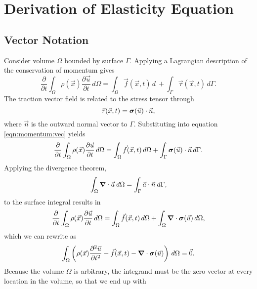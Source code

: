 \section{Derivation of Elasticity Equation}

\subsection{Vector Notation}

Consider volume $\Omega$ bounded by surface $\Gamma$. Applying a Lagrangian
description of the conservation of momentum gives
\begin{equation}
\label{eqn:momentum:vec}
\frac{\partial}{\partial t}\int_{\Omega}\rho(\vec{x})\frac{\partial\vec{u}}{\partial t}\, d\Omega=\int_{\Omega}\vec{f}(\vec{x},t)\, d\ + \int_{\Gamma}\vec{\tau}(\vec{x},t)\, d\Gamma.
\end{equation}
The traction vector field is related to the stress tensor through
\begin{equation}
\vec{\tau}(\vec{x},t) = \bm{\sigma}(\vec{u}) \cdot \vec{n},
\end{equation}
where $\vec{n}$ is the outward normal vector to $\Gamma$. Substituting
into equation \vref{eqn:momentum:vec} yields
\begin{equation}
\frac{\partial}{\partial t}\int_{\Omega}\rho(\vec{x})\frac{\partial\vec{u}}{\partial t}\, d\Omega=\int_{\Omega}\vec{f}(\vec{x},t)\, d\Omega+\int_{\Gamma}\bm{\sigma}(\vec{u})\cdot\vec{n}\, d\Gamma.
\end{equation}
Applying the divergence theorem,
\begin{equation}
\int_{\Omega}\bm{\nabla}\cdot\vec{a}\: d\Omega=\int_{\Gamma}\vec{a}\cdot\vec{n}\: d\Gamma,
\end{equation}
to the surface integral results in
\begin{equation}
\frac{\partial}{\partial t}\int_{\Omega}\rho(\vec{x})\frac{\partial\vec{u}}{\partial t}\, d\Omega=\int_{\Omega}\vec{f}(\vec{x},t)\, d\Omega+\int_{\Omega}\bm{\nabla}\cdot\bm{\sigma}(\vec{u})\, d\Omega,
\end{equation}
which we can rewrite as
\begin{equation}
\int_{\Omega}\left(\rho(\vec{x})\frac{\partial^{2}\vec{u}}{\partial t^{2}}-\vec{f}(\vec{x},t)-\bm{\nabla}\cdot\bm{\sigma}(\vec{u})\right)\, d\Omega=\vec{0}.
\end{equation}
Because the volume $\Omega$ is arbitrary, the integrand must be the zero
vector at every location in the volume, so that we end up with
